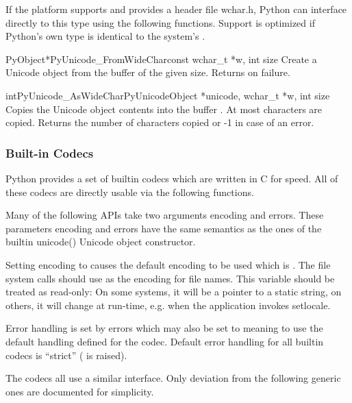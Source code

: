 If the platform supports  and provides a header file
wchar.h, Python can interface directly to this type using the
following functions. Support is optimized if Python's own
 type is identical to the system's .

\begin{cfuncdesc}{PyObject*}{PyUnicode_FromWideChar}{const wchar_t *w,
                                                     int size}
  Create a Unicode object from the  buffer  of
  the given size.  Returns \NULL{} on failure.
\end{cfuncdesc}

\begin{cfuncdesc}{int}{PyUnicode_AsWideChar}{PyUnicodeObject *unicode,
                                             wchar_t *w,
                                             int size}
  Copies the Unicode object contents into the  buffer
  .  At most   characters are copied.
  Returns the number of  characters copied or -1 in
  case of an error.
\end{cfuncdesc}


\subsubsection{Built-in Codecs \label{builtinCodecs}}

Python provides a set of builtin codecs which are written in C
for speed. All of these codecs are directly usable via the
following functions.

Many of the following APIs take two arguments encoding and
errors. These parameters encoding and errors have the same semantics
as the ones of the builtin unicode() Unicode object constructor.

Setting encoding to \NULL{} causes the default encoding to be used
which is \ASCII.  The file system calls should use
 as the encoding for file
names. This variable should be treated as read-only: On some systems,
it will be a pointer to a static string, on others, it will change at
run-time, e.g. when the application invokes setlocale.

Error handling is set by errors which may also be set to \NULL{}
meaning to use the default handling defined for the codec.  Default
error handling for all builtin codecs is ``strict''
( is raised).

The codecs all use a similar interface.  Only deviation from the
following generic ones are documented for simplicity.

